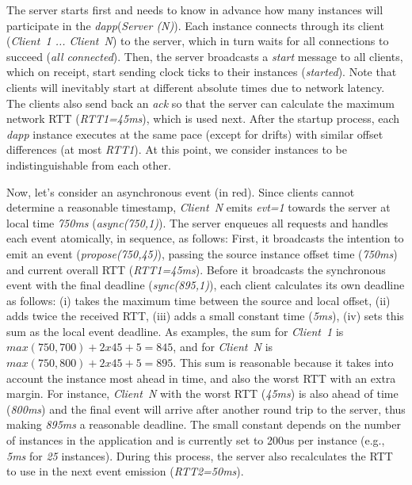 \documentclass[sigplan,screen]{acmart}
\newcommand{\dapp}{\emph{dapp}\xspace}
\begin{document}
The server starts first and needs to know in advance how many instances will
participate in the \dapp (\emph{Server (N)}).
Each instance connects through its client (\emph{Client~1 ... Client~N}) to the
server, which in turn waits for all connections to succeed
(\emph{all connected}).
Then, the server broadcasts a \emph{start} message to all clients, which on
receipt, start sending clock ticks to their instances (\emph{started}).
Note that clients will inevitably start at different absolute times due to
network latency.
The clients also send back an \emph{ack} so that the server can calculate the
maximum network RTT (\emph{RTT1=45ms}), which is used next.
%
After the startup process, each \dapp instance executes at the same pace
(except for drifts) with similar offset differences (at most \emph{RTT1}).
At this point, we consider instances to be indistinguishable from each other.

Now, let's consider an asynchronous event (in red).
%
Since clients cannot determine a reasonable timestamp, \emph{Client~N} emits
\emph{evt=1} towards the server at local time \emph{750ms} (\emph{async(750,1)}).
%
The server enqueues all requests and handles each event atomically, in
sequence, as follows:
%
First, it broadcasts the intention to emit an event (\emph{propose(750,45)}),
passing the source instance offset time (\emph{750ms}) and current overall RTT
(\emph{RTT1=45ms}).
Before it broadcasts the synchronous event with the final deadline
(\emph{sync(895,1)}), each client calculates its own deadline as follows:
    (i)   takes the maximum time between the source and local offset,
    (ii)  adds twice the received RTT,
    (iii) adds a small constant time (\emph{5ms}),
    (iv)  sets this sum as the local event deadline.
As examples, the sum for
    \emph{Client~1} is $max(750,700)+2x45+5=845$, and for
    \emph{Client~N} is $max(750,800)+2x45+5=895$.
%
This sum is reasonable because it takes into account
    the instance most ahead in time, and also
    the worst RTT with an extra margin.
For instance, \emph{Client~N} with the worst RTT (\emph{45ms}) is also ahead of
time (\emph{800ms}) and the final event will arrive after another round trip to
the server, thus making \emph{895ms} a reasonable deadline.
%
The small constant depends on the number of instances in the application and is
currently set to 200us per instance (e.g., \emph{5ms} for \emph{25} instances).
%
During this process, the server also recalculates the RTT to use in the next
event emission (\emph{RTT2=50ms}).
\end{document}
